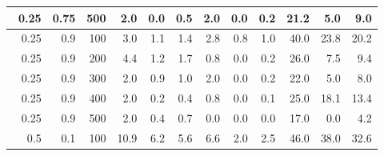 \begin{longtable}{|r|r|r|r|r|r|r|r|r|r|r|r|}
    \hline \
    0.25                           & 0.75                     & 500                       & 2.0                       & 0.0                       & 0.5                       & 2.0                       & 0.0                       & 0.2                       & 21.2                      & 5.0                       & 9.0                       \\
    \hline \
    0.25                           & 0.9                     & 100                       & 3.0                       & 1.1                       & 1.4                       & 2.8                       & 0.8                       & 1.0                       & 40.0                      & 23.8                       & 20.2                       \\
    \hline \
    0.25                           & 0.9                     & 200                       & 4.4                       & 1.2                       & 1.7                       & 0.8                       & 0.0                       & 0.2                       & 26.0                      & 7.5                      & 9.4                      \\
    \hline \
    0.25                           & 0.9                     & 300                       & 2.0                       & 0.9                       & 1.0                       & 2.0                       & 0.0                       & 0.2                       & 22.0                      & 5.0                       & 8.0                       \\
    \hline \
    0.25                            & 0.9                     & 400                       & 2.0                      & 0.2                       & 0.4                       & 0.8                       & 0.0                       & 0.1                       & 25.0                      & 18.1                      & 13.4                      \\
    \hline \
    0.25                            & 0.9                     & 500                       & 2.0                       & 0.4                       & 0.7                       & 0.0                       & 0.0                       & 0.0                       & 17.0                      & 0.0                      & 4.2                      \\
    \hline \
    0.5                            & 0.1                     & 100                       & 10.9                       & 6.2                       & 5.6                       & 6.6                       & 2.0                       & 2.5                       & 46.0                      & 38.0                      & 32.6                      \\

\end{longtable}
